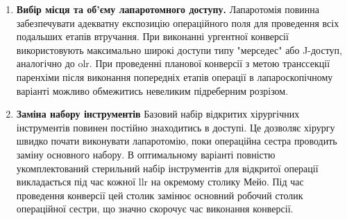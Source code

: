 \begin{refsection}
\begin{enumerate}
    \item \textbf{Вибір місця та об'єму лапаротомного доступу.} Лапаротомія повинна забезпечувати адекватну експозицію операційного поля для проведення всіх подальших етапів втручання. При виконанні ургентної конверсії використовують максимально широкі доступи типу "мерседес" або J-доступ, аналогічно до \acrshort{olr}. При проведенні планової конверсії з метою транссекції паренхіми після виконання попередніх етапів операції в лапароскопічному варіанті можливо обмежитись невеликим підреберним розрізом.
    
    \item \textbf{Заміна набору інструментів} Базовий набір відкритих хірургічних інструментів повинен постійно знаходитись в доступі. Це дозволяє хірургу швидко почати виконувати лапаротомію, поки операційна сестра проводить заміну основного набору. В оптимальному варіанті повністю укомплектований стерильний набір інструментів для відкритої операції викладається під час кожної \acrshort{llr} на окремому столику Мейо. Під час проведення конверсії цей столик замінює основний робочий столик операційної сестри, що значно скорочує час виконання конверсії.
    
\end{enumerate}


\printbibliography [heading=subbibliography]
\end{refsection}